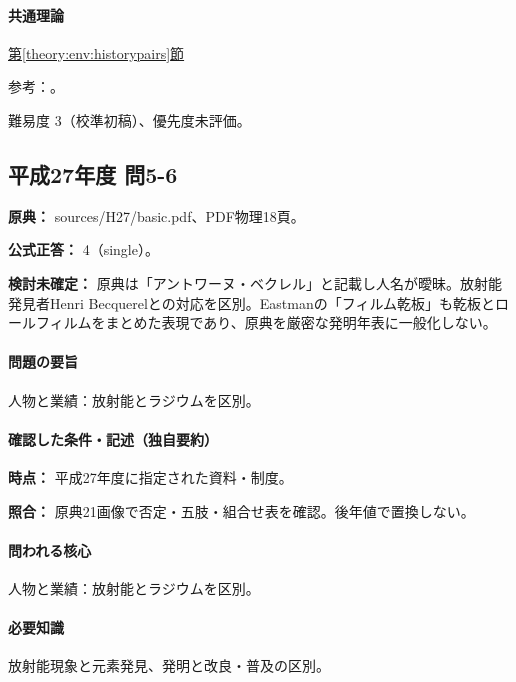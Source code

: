 \paragraph{共通理論} \hyperref[theory:env:historypairs]{第\ref*{theory:env:historypairs}節}

\par 参考：\cite{env58_curie}。

\par 難易度 3（校準初稿）、優先度未評価。

\subsection{平成27年度 問5-6}
\label{q:h27-reg-basic-5-6}

\noindent\textbf{原典：} sources/H27/basic.pdf、PDF物理18頁。

\textbf{公式正答：} 4（single）。

\par\textbf{検討未確定：} 原典は「アントワーヌ・ベクレル」と記載し人名が曖昧。放射能発見者Henri Becquerelとの対応を区別。Eastmanの「フィルム乾板」も乾板とロールフィルムをまとめた表現であり、原典を厳密な発明年表に一般化しない。

\paragraph{問題の要旨} 人物と業績：放射能とラジウムを区別。

\paragraph{確認した条件・記述（独自要約）}\mbox{}\par

\noindent\textbf{時点：} 平成27年度に指定された資料・制度。\par

\noindent\textbf{照合：} 原典21画像で否定・五肢・組合せ表を確認。後年値で置換しない。\par

\paragraph{問われる核心} 人物と業績：放射能とラジウムを区別。

\paragraph{必要知識} 放射能現象と元素発見、発明と改良・普及の区別。


